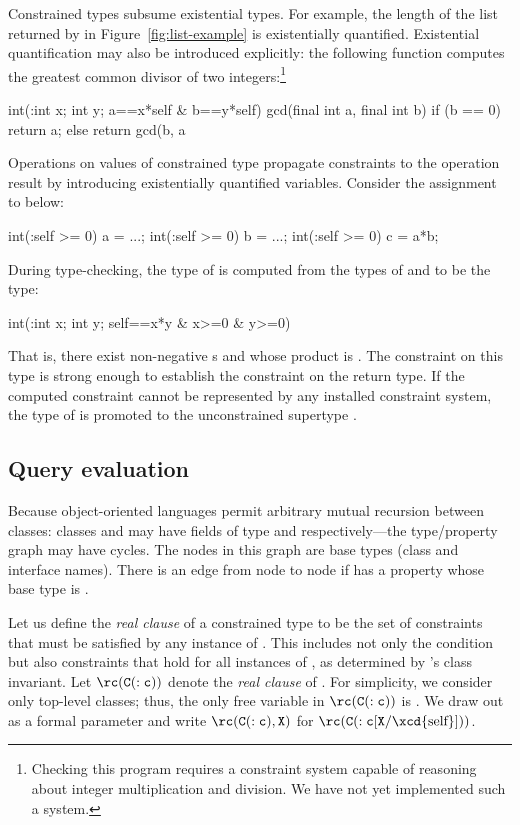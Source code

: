 Constrained types subsume existential types.
For example, the length of the
list returned by  in Figure~\ref{fig:list-example} is existentially
quantified.
Existential quantification may also be introduced explicitly:
the following function computes the greatest
common divisor of two integers:\footnote{Checking this program
requires a constraint system capable of reasoning about integer
multiplication and
division.  We have not yet implemented such a system.}
\begin{displayxten}
int(:int x; int y; a==x*self & b==y*self)
  gcd(final int a, final int b)
{
    if (b == 0) return a;
    else return gcd(b, a %
}
\end{displayxten}
\fi

Operations on values of constrained type
propagate constraints
to the operation result by introducing existentially quantified
variables.  Consider the assignment to  below:
\begin{displayxten}
int(:self >= 0) a = ...;
int(:self >= 0) b = ...;
int(:self >= 0) c = a*b;
\end{displayxten}
During type-checking, the type of  is
computed from the types of  and  to be
the type:
\begin{displayxten}
int(:int x; int y; self==x*y & x>=0 & y>=0)
\end{displayxten}
That is, there exist non-negative s  and  
whose product is .
The constraint on this type is strong enough to establish the
constraint on the return type.  If the computed constraint cannot be
represented by any installed constraint system,
the type of  is promoted to the unconstrained supertype .

\subsection{Query evaluation}

Because object-oriented languages permit arbitrary mutual recursion between
classes: classes  and  may have fields of type  and
 respectively---the type/property graph may have cycles. The nodes
in this graph are base types (class and interface names). There is an
edge from node  to node  if  has a property whose
base type is .

Let us define the {\em real clause} of a constrained type  to be
the set of constraints that must be satisfied by any instance of
. This includes not only the condition  but also
constraints that hold for all instances of , as
determined by 's class invariant. Let 
$\rc({\tt C(:c)})$ denote the {\em real clause} of .
For simplicity, we consider only top-level classes; thus, the
only free variable
in $\rc({\tt C(:c)})$ is .  We draw out  as a
formal parameter and write $\rc({\tt C(:c)}, {\tt X})$
for $\rc({\tt C(:c}[{\tt X}/\mbox{\xcd{self}}]))$.

